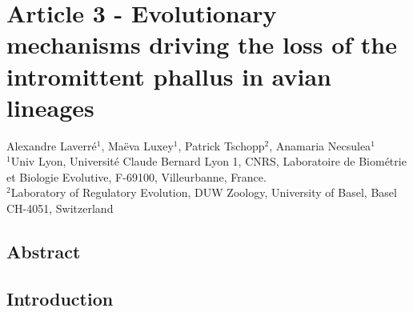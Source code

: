 \chapter{Article 3 - Evolutionary mechanisms driving the loss of the intromittent phallus in avian lineages}
\label{IPLOSS}

\begin{center}
    \large Alexandre Laverré$^{\text{1}}$, Maëva Luxey$^{\text{1}}$, Patrick Tschopp$^{\text{2}}$, Anamaria Necsulea$^{\text{1}}$\\
    \vspace{0.5cm}
    \normalsize
    $^{\text{1}}$Univ Lyon, Université Claude Bernard Lyon 1, CNRS, Laboratoire de Biométrie et Biologie Evolutive, F-69100, Villeurbanne, France.\\
    $^{\text{2}}$Laboratory of Regulatory Evolution, DUW Zoology, University of Basel, Basel CH-4051, Switzerland\\
\end{center}

{\hypersetup{linkcolor=GREYDARK}\minitoc}

\section{Abstract}

\section{Introduction}

